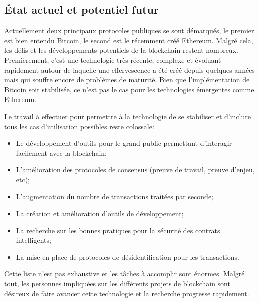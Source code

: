 \documentclass{tnreport}
\begin{document}
\subsection{État actuel et potentiel futur}

Actuellement deux principaux protocoles publiques se sont démarqués, le premier est bien entendu Bitcoin, le second est le récemment créé Ethereum. 
Malgré cela, les défis et les développements potentiels de la blockchain restent nombreux.
Premièrement, c'est une technologie très récente, complexe et évoluant rapidement autour de laquelle une effervescence a été créé depuis quelques années mais qui souffre encore de problèmes de maturité.
Bien que l'implémentation de Bitcoin soit stabilisée, ce n'est pas le cas pour les technologies émergentes comme Ethereum.

Le travail à effectuer pour permettre à la technologie de se stabiliser et d'inclure tous les cas d'utilisation possibles reste colossale:
\begin{itemize}
	\item Le développement d'outils pour le grand public permettant d'interagir facilement avec la blockchain;
	\item L'amélioration des protocoles de consensus (preuve de travail, preuve d'enjeu, etc);
	\item L'augmentation du nombre de transactions traitées par seconde;
	\item La création et amélioration d'outils de développement;
	\item La recherche sur les bonnes pratiques pour la sécurité des contrats intelligents;
	\item La mise en place de protocoles de désidentification pour les transactions.
	\newline
\end{itemize}
Cette liste n'est pas exhaustive et les tâches à accomplir sont énormes.
Malgré tout, les personnes impliquées sur les différents projets de blockchain sont désireux de faire avancer cette technologie et la recherche progresse rapidement.
\end{document}
